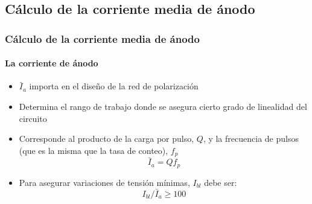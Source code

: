 \documentclass{beamer}
\begin{document}

\subsection{C\'alculo de la corriente media de \'anodo}

\begin{frame}
\frametitle{C\'alculo de la corriente media de \'anodo}
\framesubtitle{La corriente de \'anodo}
\begin{block}{}
\begin{itemize}
\item $\bar{I}_a$ importa en el diseño de la red de polarizaci\'on
\item Determina el rango de trabajo donde se asegura cierto grado de
linealidad del circuito
\item Corresponde al producto de la carga por pulso, $Q$, y la
frecuencia de pulsos (que es la misma que la tasa de conteo), $f_p$
$$\bar{I}_a = Q f_p$$
\item Para asegurar variaciones de tensi\'on m\'inimas, $I_{bl}$ debe ser:
$$I_{bl}/\bar{I}_a \geq 100$$ 
\end{itemize}
\end{block}
\end{frame} 
\end{document}
